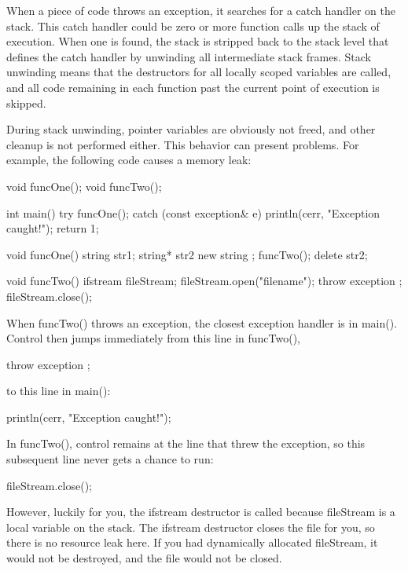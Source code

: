 
When a piece of code throws an exception, it searches for a catch handler on the stack. This catch handler could be zero or more function calls up the stack of execution. When one is found, the stack is stripped back to the stack level that defines the catch handler by unwinding all intermediate stack frames. Stack unwinding means that the destructors for all locally scoped variables are called, and all code remaining in each function past the current point of execution is skipped.

During stack unwinding, pointer variables are obviously not freed, and other cleanup is not performed either. This behavior can present problems. For example, the following code causes a memory leak:

\begin{cpp}
void funcOne();
void funcTwo();

int main()
{
    try {
        funcOne();
    } catch (const exception& e) {
        println(cerr, "Exception caught!");
        return 1;
    }
}

void funcOne()
{
    string str1;
    string* str2 { new string {} };
    funcTwo();
    delete str2;
}

void funcTwo()
{
    ifstream fileStream;
    fileStream.open("filename");
    throw exception {};
    fileStream.close();
}
\end{cpp}

When funcTwo() throws an exception, the closest exception handler is in main(). Control then jumps immediately from this line in funcTwo(),

\begin{cpp}
throw exception {};
\end{cpp}

to this line in main():

\begin{cpp}
println(cerr, "Exception caught!");
\end{cpp}

In funcTwo(), control remains at the line that threw the exception, so this subsequent line never gets a chance to run:

\begin{cpp}
fileStream.close();
\end{cpp}

However, luckily for you, the ifstream destructor is called because fileStream is a local variable on the stack. The ifstream destructor closes the file for you, so there is no resource leak here. If you had dynamically allocated fileStream, it would not be destroyed, and the file would not be closed.

